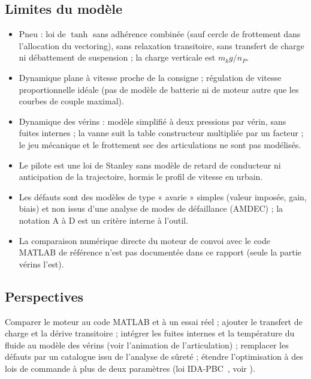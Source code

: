 \documentclass[11pt,a4paper]{article}
\newcommand{\fichier}[1]{\texttt{\detokenize{#1}}}
\begin{document}
\subsection{Limites du modèle}
\begin{itemize}
 \item Pneu : loi de $\tanh$ sans adhérence combinée (sauf cercle de frottement dans l'allocation du vectoring), sans relaxation transitoire, sans transfert de charge ni débattement de suspension ; la charge verticale est $m_kg/n_P$.
 \item Dynamique plane à vitesse proche de la consigne ; régulation de vitesse proportionnelle idéale (pas de modèle de batterie ni de moteur autre que les courbes de couple maximal).
 \item Dynamique des vérins : modèle simplifié à deux pressions par vérin, sans fuites internes ; la vanne suit la table constructeur multipliée par un facteur ; le jeu mécanique et le frottement sec des articulations ne sont pas modélisés.
 \item Le pilote est une loi de Stanley sans modèle de retard de conducteur ni anticipation de la trajectoire, hormis le profil de vitesse en urbain.
 \item Les défauts sont des modèles de type « avarie » simples (valeur imposée, gain, biais) et non issus d'une analyse de modes de défaillance (AMDEC) ; la notation A à D est un critère interne à l'outil.
 \item La comparaison numérique directe du moteur de convoi avec le code MATLAB de référence n'est pas documentée dans ce rapport (seule la partie vérins l'est).
\end{itemize}

\subsection{Perspectives}
Comparer le moteur au code MATLAB et à un essai réel ; ajouter le transfert de charge et la dérive transitoire ; intégrer les fuites internes et la température du fluide au modèle des vérins (voir l'animation de l'articulation) ; remplacer les défauts par un catalogue issu de l'analyse de sûreté ; étendre l'optimisation à des lois de commande à plus de deux paramètres (loi IDA-PBC~\cite{Ortega2002}, voir \fichier{convoi_porthamiltonien.tex}).

\appendix
\end{document}
